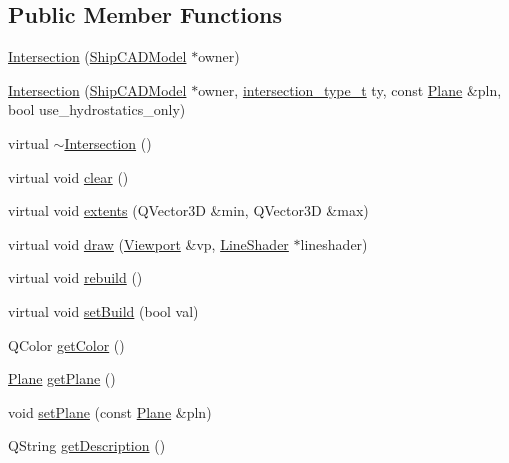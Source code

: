 \subsection*{Public Member Functions}
\begin{DoxyCompactItemize}
\item 
\hyperlink{classShipCAD_1_1Intersection_acde7d35483e1e4ee56ecf75eb7a70f66}{Intersection} (\hyperlink{classShipCAD_1_1ShipCADModel}{Ship\-C\-A\-D\-Model} $\ast$owner)
\item 
\hyperlink{classShipCAD_1_1Intersection_a3a4f17fe81289d26d2ec329dd9db5c69}{Intersection} (\hyperlink{classShipCAD_1_1ShipCADModel}{Ship\-C\-A\-D\-Model} $\ast$owner, \hyperlink{namespaceShipCAD_aa56834b730aafdf2786ddc9a60a046fd}{intersection\-\_\-type\-\_\-t} ty, const \hyperlink{classShipCAD_1_1Plane}{Plane} \&pln, bool use\-\_\-hydrostatics\-\_\-only)
\item 
virtual \hyperlink{classShipCAD_1_1Intersection_a017d0a1000ca2e9eca3537def58b3988}{$\sim$\-Intersection} ()
\item 
virtual void \hyperlink{classShipCAD_1_1Intersection_a2163245dc7153d1590811ab2902d6ee4}{clear} ()
\item 
virtual void \hyperlink{classShipCAD_1_1Intersection_af751d515708531ca098321840a92c47b}{extents} (Q\-Vector3\-D \&min, Q\-Vector3\-D \&max)
\item 
virtual void \hyperlink{classShipCAD_1_1Intersection_a9e346019a52aa0540628b75994ea94a5}{draw} (\hyperlink{classShipCAD_1_1Viewport}{Viewport} \&vp, \hyperlink{classShipCAD_1_1LineShader}{Line\-Shader} $\ast$lineshader)
\item 
virtual void \hyperlink{classShipCAD_1_1Intersection_aed30bdca43037f72b85c4d53e234fd6c}{rebuild} ()
\item 
virtual void \hyperlink{classShipCAD_1_1Intersection_a2b496f9ab21c5fc4a7b97a665b24f2b1}{set\-Build} (bool val)
\item 
Q\-Color \hyperlink{classShipCAD_1_1Intersection_acae07360e9ccef12a498332ac6dbedd9}{get\-Color} ()
\item 
\hyperlink{classShipCAD_1_1Plane}{Plane} \hyperlink{classShipCAD_1_1Intersection_ac0b838a811f8df5c2fa0b0ea44ba4bb7}{get\-Plane} ()
\item 
void \hyperlink{classShipCAD_1_1Intersection_a582c3dcbe3016c554b6bba094e2854ce}{set\-Plane} (const \hyperlink{classShipCAD_1_1Plane}{Plane} \&pln)
\item 
Q\-String \hyperlink{classShipCAD_1_1Intersection_ab0434113cfd34c8a3ab11f75976dbf5b}{get\-Description} ()

\end{DoxyCompactItemize}
